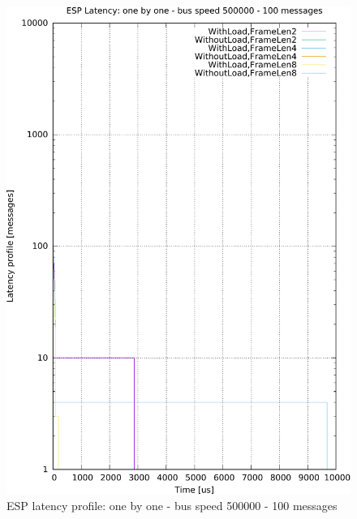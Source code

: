\documentclass{ctuthesis}
\begin{document}
\begin{figure}[htb]
\includegraphics[width=\linewidth]{figures/speed500000_messages100_floodFalse.pdf}
\caption{ESP latency profile: one by one - bus speed 500000 - 100 messages}
\end{figure}
\end{document}
